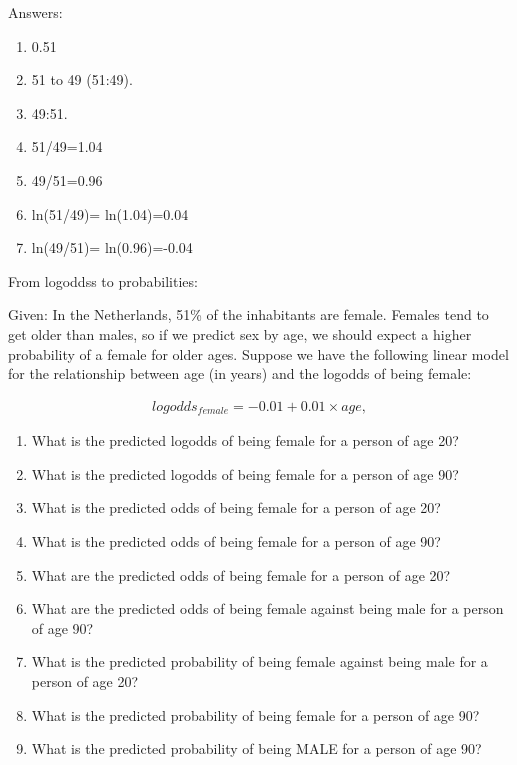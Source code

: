 \documentclass[]{report}\usepackage[]{graphicx}\usepackage[]{color}
\begin{document}
Answers:

\begin{enumerate}

\item
0.51


\item
51 to 49 (51:49).

\item
49:51.

\item
51/49=1.04

\item
49/51=0.96


\item
ln(51/49)= ln(1.04)=0.04

\item
ln(49/51)= ln(0.96)=-0.04


\end{enumerate}

From logoddss to probabilities:

Given:
In the Netherlands, 51\% of the inhabitants are female. Females tend to get older than males, so if we predict sex by age, we should expect a higher probability of a female for older ages. Suppose we have the following linear model for the relationship between age (in years) and the logodds of being female:


\begin{eqnarray}
logodds_{female}=-0.01 + 0.01 \times age, \nonumber
\end{eqnarray}

\begin{enumerate}

\item
What is the predicted logodds of being female for a person of age 20?

\item
What is the predicted logodds of being female for a person of age 90?

\item
What is the predicted odds of being female for a person of age 20?

\item
What is the predicted odds of being female for a person of age 90?

\item
What are the predicted odds of being female for a person of age 20?

\item
What are the predicted odds of being female against being male for a person of age 90?

\item
What is the predicted probability of being female against being male for a person of age 20?

\item
What is the predicted probability of being female for a person of age 90?

\item
What is the predicted probability of being MALE for a person of age 90?


\end{enumerate}
\end{document}

